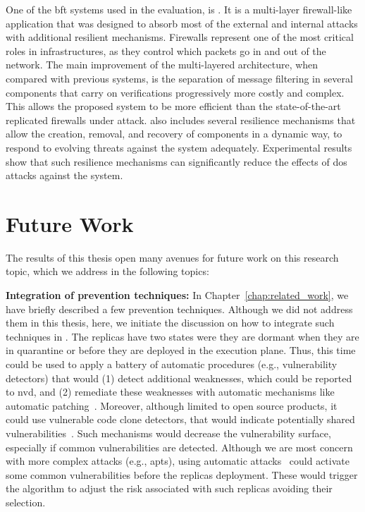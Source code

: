 One of the \gls{bft} systems used in the \system evaluation, is \sieveq. 
It is a multi-layer firewall-like application that was designed to absorb most of the external and internal attacks with additional resilient mechanisms.
Firewalls represent one of the most critical roles in infrastructures, as they control which packets go in and out of the network.
The main improvement of the \sieveq multi-layered architecture, when compared with previous systems, is the separation of message filtering in several components that carry on verifications progressively more costly and complex.
This allows the proposed system to be more efficient than the state-of-the-art replicated firewalls under attack.
\sieveq also includes several resilience mechanisms that allow the creation, removal, and recovery of components in a dynamic way, to respond to evolving threats against the system adequately. Experimental results show that such resilience mechanisms can significantly reduce the effects of \gls{dos} attacks against the system.



\section{Future Work}
The results of this thesis open many avenues for future work on this research topic, which we address in the following topics:


\textbf{Integration of prevention techniques:}
In Chapter~\ref{chap:related_work}, we have briefly described a few prevention techniques.
Although we did not address them in this thesis, here, we initiate the discussion on how to integrate such techniques in \system.
The \system replicas have two states were they are dormant when they are in quarantine or before they are deployed in the execution plane.
Thus, this time could be used to apply a battery of automatic procedures (e.g., vulnerability detectors) that would (1) detect additional weaknesses, which could be reported to \gls{nvd}, and (2) remediate these weaknesses with automatic mechanisms like automatic patching~\cite{Huang:2016}.
Moreover, although limited to open source products, it could use vulnerable code clone detectors, that would indicate potentially shared vulnerabilities~\cite{Kim:2017,Xu:2017}.
Such mechanisms would decrease the vulnerability surface, especially if common vulnerabilities are detected.
Although we are most concern with more complex attacks (e.g., \gls{apts}), using automatic attacks~\cite{Hu:2015} could activate some common vulnerabilities before the replicas deployment.
These would trigger the algorithm to adjust the risk associated with such replicas avoiding their selection.


